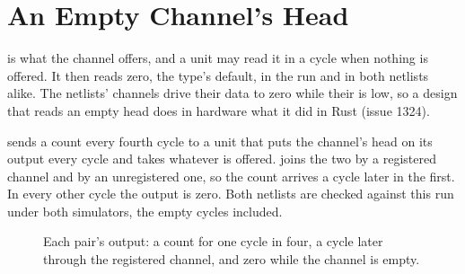 \section{An Empty Channel's Head}
\label{sec:x-empty}

 is what the channel offers, and a unit may read it in
a cycle when nothing is offered.
It then reads zero, the type's default, in the run and in both
netlists alike.
The netlists' channels drive their data to zero while their
 is low, so a design that reads an empty head does in
hardware what it did in Rust (issue 1324).

 sends a count every fourth cycle to a unit that puts
the channel's head on its output every cycle and takes whatever is
offered.
 joins the two by a registered channel and  by
an unregistered one, so the count arrives a cycle later in the first.
In every other cycle the output is zero.
Both netlists are checked against this run under both simulators,
the empty cycles included.

\begin{figure}[htbp]
\centering

\caption{Each pair's output: a count for one cycle in four, a cycle
later through the registered channel, and zero while the channel is
empty.}
\label{fig:x-empty}
\end{figure}




